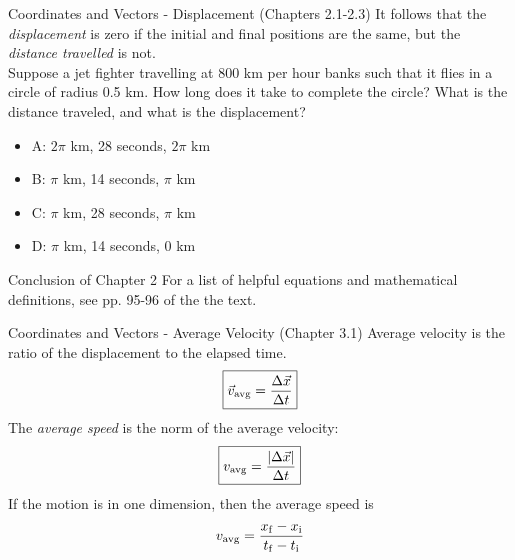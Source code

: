 \documentclass{beamer}
\begin{document}
\begin{frame}{Coordinates and Vectors - Displacement (Chapters 2.1-2.3)}
It follows that the \textit{displacement} is zero if the initial and final positions are the same, but the \textit{distance travelled} is not.\\
\vspace{0.2cm}
\small
Suppose a jet fighter travelling at 800 km per hour banks such that it flies in a circle of radius 0.5 km.  How long does it take to complete the circle?  What is the distance traveled, and what is the displacement?
\begin{itemize}
\item A: $2\pi$ km, 28 seconds, $2\pi$ km
\item B: $\pi$ km, 14 seconds, $\pi$ km
\item C: $\pi$ km, 28 seconds, $\pi$ km
\item D: $\pi$ km, 14 seconds, $0$ km
\end{itemize}
\end{frame}

\begin{frame}{Conclusion of Chapter 2}
For a list of helpful equations and mathematical definitions, see pp. 95-96 of the the text.
\end{frame}

\begin{frame}{Coordinates and Vectors - Average Velocity  (Chapter 3.1)}
\alert{Average velocity} is the ratio of the \alert{displacement} to the elapsed time.\\
\begin{equation}
\boxed{\vec{v}_{\rm avg} = \frac{\Delta \vec{x}}{\Delta t}}
\end{equation}
The \textit{average speed} is the norm of the average velocity:
\begin{equation}
\boxed{v_{\rm avg} = \frac{|\Delta \vec{x}|}{\Delta t}}
\end{equation}
If the motion is in one dimension, then the average speed is
\begin{equation}
v_{\rm avg} = \frac{x_{\rm f} - x_{\rm i}}{t_{\rm f} - t_{\rm i}}
\end{equation}
\end{frame}
\end{document}
